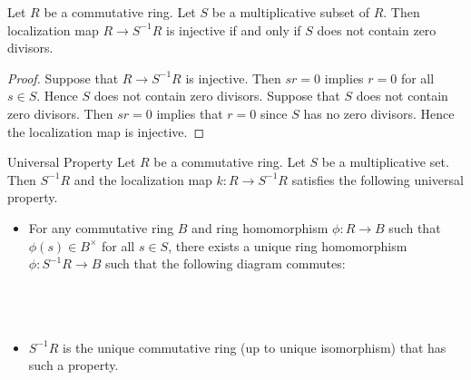 \documentclass[a4paper]{article}
\begin{document}
\begin{lmm}{}{} Let $R$ be a commutative ring. Let $S$ be a multiplicative subset of $R$. Then localization map $R\to S^{-1}R$ is injective if and only if $S$ does not contain zero divisors. 
\begin{proof}
Suppose that $R\to S^{-1}R$ is injective. Then $sr=0$ implies $r=0$ for all $s\in S$. Hence $S$ does not contain zero divisors. Suppose that $S$ does not contain zero divisors. Then $sr=0$ implies that $r=0$ since $S$ has no zero divisors. Hence the localization map is injective. 
\end{proof}
\end{lmm}

\begin{prp}{Universal Property}{} Let $R$ be a commutative ring. Let $S$ be a multiplicative set. Then $S^{-1}R$ and the localization map $k:R\to S^{-1}R$ satisfies the following universal property. 
\begin{itemize}
\item For any commutative ring $B$ and ring homomorphism $\phi:R\to B$ such that $\phi(s)\in B^\times$ for all $s\in S$, there exists a unique ring homomorphism $\phi:S^{-1}R\to B$ such that the following diagram commutes: \\~\\
 \\~\\
\item $S^{-1}R$ is the unique commutative ring (up to unique isomorphism) that has such a property. 
\end{itemize}
\end{prp}
\end{document}
